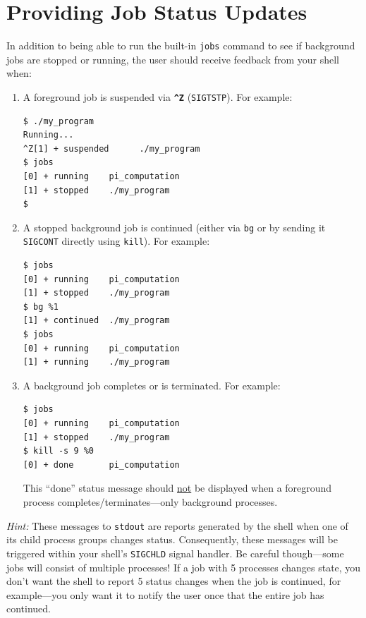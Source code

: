 \documentclass[10pt]{article}
\newcommand{\ctrl}[1]{\texttt{\textbf{\string^#1}}}
\begin{document}
\section{Providing Job Status Updates}

In addition to being able to run the built-in \texttt{jobs} command to
see if background jobs are stopped or running, the user should receive
feedback from your shell when:

\begin{enumerate}
    \item A foreground job is suspended via \ctrl{Z} (\texttt{SIGTSTP}).
         For example:

\begin{verbatim}
$ ./my_program
Running...
^Z[1] + suspended      ./my_program
$ jobs
[0] + running    pi_computation
[1] + stopped    ./my_program
$
\end{verbatim}

    \item A stopped background job is continued (either via \texttt{bg}
            or by sending it \texttt{SIGCONT} directly using \texttt{kill}).
            For example:

\begin{verbatim}
$ jobs
[0] + running    pi_computation
[1] + stopped    ./my_program
$ bg %1
[1] + continued  ./my_program
$ jobs
[0] + running    pi_computation
[1] + running    ./my_program
\end{verbatim}

    \item A background job completes or is terminated. For example:

\begin{verbatim}
$ jobs
[0] + running    pi_computation
[1] + stopped    ./my_program
$ kill -s 9 %0
[0] + done       pi_computation
\end{verbatim}

    This ``done'' status message should \underline{not} be displayed when a
    foreground process completes/terminates---only background processes.

\end{enumerate}

\emph{Hint:} These messages to \texttt{stdout} are reports generated by
the shell when one of its child process groups changes status.
Consequently, these messages will be triggered within your shell's
\texttt{SIGCHLD} signal handler. Be careful though---some jobs will
consist of multiple processes!  If a job with 5 processes changes state,
you don't want the shell to report 5 status changes when the job is
continued, for example---you only want it to notify the user once that
the entire job has continued.
\end{document}
